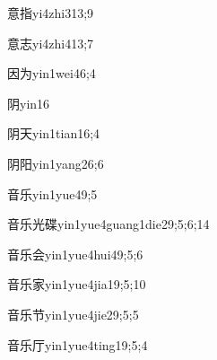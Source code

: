 \begin{verbete}{意指}{yi4zhi3}{13;9}
\end{verbete}

\begin{verbete}{意志}{yi4zhi4}{13;7}
\end{verbete}

\begin{verbete}{因为}{yin1wei4}{6;4}
\end{verbete}

\begin{verbete}{阴}{yin1}{6}
\end{verbete}

\begin{verbete}{阴天}{yin1tian1}{6;4}
\end{verbete}

\begin{verbete}{阴阳}{yin1yang2}{6;6}
\end{verbete}

\begin{verbete}{音乐}{yin1yue4}{9;5}
\end{verbete}

\begin{verbete}{音乐光碟}{yin1yue4guang1die2}{9;5;6;14}
\end{verbete}

\begin{verbete}{音乐会}{yin1yue4hui4}{9;5;6}
\end{verbete}

\begin{verbete}{音乐家}{yin1yue4jia1}{9;5;10}
\end{verbete}

\begin{verbete}{音乐节}{yin1yue4jie2}{9;5;5}
\end{verbete}

\begin{verbete}{音乐厅}{yin1yue4ting1}{9;5;4}
\end{verbete}


